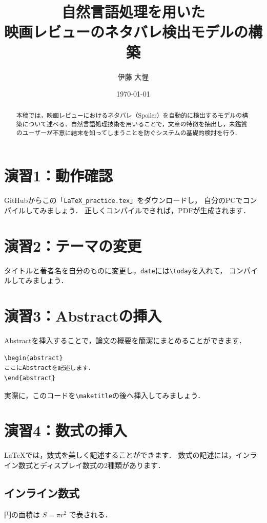 \documentclass[a4paper,twocolumn]{jsarticle}
\title{自然言語処理を用いた\\映画レビューのネタバレ検出モデルの構築}
\author{伊藤 大惺}
\date{\today}
\begin{document}
\maketitle

\begin{abstract}
本稿では，映画レビューにおけるネタバレ（Spoiler）を自動的に検出するモデルの構築について述べる．自然言語処理技術を用いることで，文章の特徴を抽出し，未鑑賞のユーザーが不意に結末を知ってしまうことを防ぐシステムの基礎的検討を行う．
\end{abstract}

\section*{演習1：動作確認}
GitHubからこの「\texttt{LaTeX\_practice.tex}」をダウンロードし，
自分のPCでコンパイルしてみましょう．
正しくコンパイルできれば，PDFが生成されます．

\section*{演習2：テーマの変更}
タイトルと著者名を自分のものに変更し，\texttt{date}には\verb|\today|を入れて，
コンパイルしてみましょう．

\section*{演習3：Abstractの挿入}
Abstractを挿入することで，論文の概要を簡潔にまとめることができます．

\begin{verbatim}
\begin{abstract}
ここにAbstractを記述します．
\end{abstract}
\end{verbatim}

実際に，このコードを\verb|\maketitle|の後へ挿入してみましょう．

\section*{演習4：数式の挿入}
LaTeXでは，数式を美しく記述することができます．
数式の記述には，インライン数式とディスプレイ数式の2種類があります．

\subsection*{インライン数式}
円の面積は $S=\pi r^2$ で表される．
\end{document}
